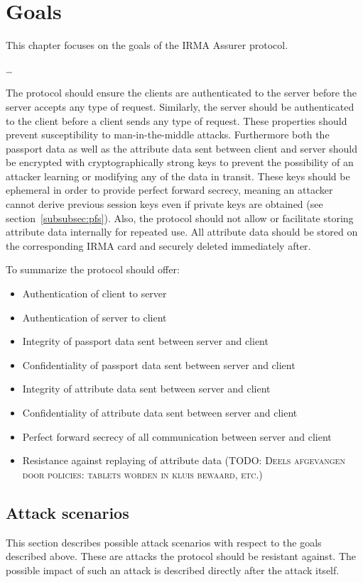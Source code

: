 \section{Goals}
This chapter focuses on the goals of the IRMA Assurer protocol.

\ldots

The protocol should ensure the clients are authenticated to the server before the server accepts any type of request. Similarly, the server should be authenticated to the client before a client sends any type of request. These properties should prevent susceptibility to man-in-the-middle attacks. Furthermore both the passport data as well as the attribute data sent between client and server should be encrypted with cryptographically strong keys to prevent the possibility of an attacker learning or modifying any of the data in transit. These keys should be ephemeral in order to provide perfect forward secrecy, meaning an attacker cannot derive previous session keys even if private keys are obtained (see section~\ref{subsubsec:pfs}). Also, the protocol should not allow or facilitate storing attribute data internally for repeated use. All attribute data should be stored on the corresponding IRMA card and securely deleted immediately after.

To summarize the protocol should offer:
\begin{itemize}
  \item Authentication of client to server
  \item Authentication of server to client
  \item Integrity of passport data sent between server and client
  \item Confidentiality of passport data sent between server and client
  \item Integrity of attribute data sent between server and client
  \item Confidentiality of attribute data sent between server and client
  \item Perfect forward secrecy of all communication between server and client
  \item Resistance against replaying of attribute data (\textsc{TODO: Deels afgevangen door policies: tablets worden in kluis bewaard, etc.})
\end{itemize}

\subsection{Attack scenarios}
This section describes possible attack scenarios with respect to the goals described above. These are attacks the protocol should be resistant against. The possible impact of such an attack is described directly after the attack itself.

